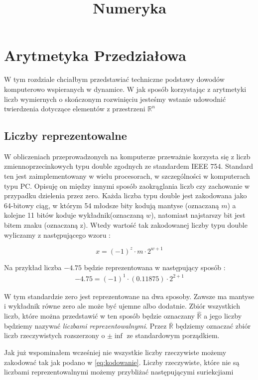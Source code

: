 \title{Numeryka}

\section{Arytmetyka Przedziałowa}
W tym rozdziale chciałbym przedstawiać techniczne podstawy dowodów komputerowo wspieranych
w dynamice. W jak sposób korzystając z arytmetyki liczb wymiernych o skończonym rozwinięciu
jesteśmy wstanie udowodnić twierdzenia dotyczące elementów z przestrzeni $ \mathbb R^n$ 

\subsection{Liczby reprezentowalne}

W obliczeniach przeprowadzonych na komputerze przeważnie korzysta się z liczb zmiennoprzecinkowych typu double 
zgodnych ze standardem IEEE 754. Standard ten jest zaimplementowany w 
wielu procesorach, w szczególności w komputerach typu PC.
Opisuję on między innymi sposób zaokrąglania liczb czy zachowanie w przypadku dzielenia przez zero.
  Każda liczba typu double jest zakodowana jako 64-bitowy ciąg, w którym 54 młodsze bity kodują mantyse (oznaczaną $m$) a kolejne
11 bitów koduje wykładnik(oznaczaną $w$), natomiast najstarszy bit jest bitem znaku (oznaczaną z). Wtedy wartość tak zakodowanej liczby typu
double wyliczamy z następującego wzoru :

\begin{equation}\label{eq:kodowanie}
  x = (-1)^z \cdot m \cdot 2^{w+1}
\end{equation}

Na przykład liczba $-4.75 $ będzie reprezentowana w następujący sposób :
\begin{eqnarray*}
 -4.75 = (-1)^{1} \cdot (0.11875) \cdot 2^{2+1}
\end{eqnarray*}

W tym standardzie zero jest reprezentowane na dwa sposoby. Zawsze ma mantyse i wykładnik równe zero ale może być 
ujemne albo dodatnie.
Zbiór wszystkich liczb, które można przedstawić w ten sposób będzie oznaczany $ \hat{\mathbb{R}} $ a jego 
liczby będziemy nazywać {\em liczbami reprezentowalnymi}. Przez $ \overline{\mathbb R}$ będziemy oznaczać
zbiór liczb rzeczywistych rozszerzony o $ \pm \inf$ ze standardowym porządkiem.

Jak już wspominałem wcześniej nie wszystkie liczby rzeczywiste możemy zakodować tak jak podano w \ref{eq:kodowanie}.
Liczby rzeczywiste, które nie są liczbami reprezentowalnymi możemy przybliżać następującymi suriekcjiami


